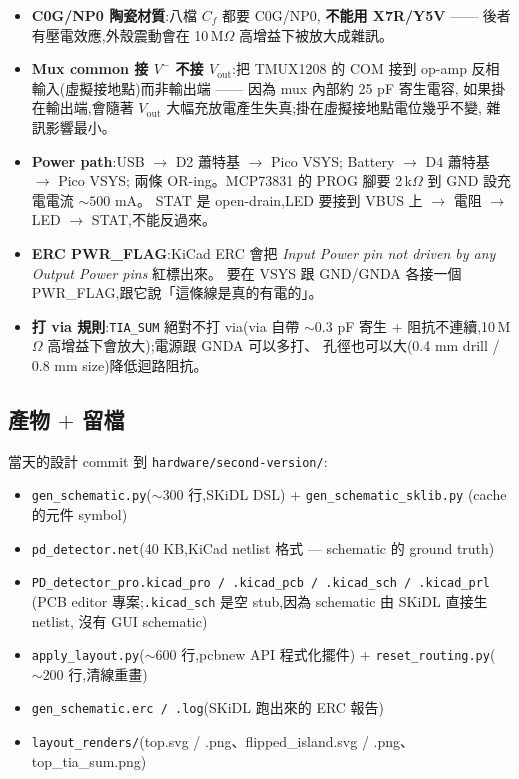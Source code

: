 \begin{itemize}[leftmargin=2em,itemsep=0pt]
  \item \textbf{C0G/NP0 陶瓷材質}:八檔 \(C_f\) 都要 C0G/NP0,
        \textbf{不能用 X7R/Y5V} —— 後者有壓電效應,外殼震動會在 10\,M\(\Omega\)
        高增益下被放大成雜訊。
  \item \textbf{Mux common 接 \(V^-\) 不接 \(V_\text{out}\)}:把 TMUX1208 的 COM 接到
        op-amp 反相輸入(虛擬接地點)而非輸出端 —— 因為 mux 內部約 25 pF 寄生電容,
        如果掛在輸出端,會隨著 \(V_\text{out}\) 大幅充放電產生失真;掛在虛擬接地點電位幾乎不變,
        雜訊影響最小。
  \item \textbf{Power path}:USB \(\to\) D2 蕭特基 \(\to\) Pico VSYS;
        Battery \(\to\) D4 蕭特基 \(\to\) Pico VSYS;
        兩條 OR-ing。MCP73831 的 PROG 腳要 2\,k\(\Omega\) 到 GND 設充電電流 \(\sim 500\) mA。
        STAT 是 open-drain,LED 要接到 VBUS 上 \(\to\) 電阻 \(\to\) LED \(\to\) STAT,不能反過來。
  \item \textbf{ERC PWR\_FLAG}:KiCad ERC 會把
        \emph{Input Power pin not driven by any Output Power pins} 紅標出來。
        要在 VSYS 跟 GND/GNDA 各接一個 PWR\_FLAG,跟它說「這條線是真的有電的」。
  \item \textbf{打 via 規則}:\texttt{TIA\_SUM} 絕對不打 via(via 自帶 \(\sim 0.3\) pF 寄生 +
        阻抗不連續,10\,M\(\Omega\) 高增益下會放大);電源跟 GNDA 可以多打、
        孔徑也可以大(0.4 mm drill / 0.8 mm size)降低迴路阻抗。
\end{itemize}

\subsection*{產物 \(+\) 留檔}

當天的設計 commit 到 \texttt{hardware/second-version/}:

\begin{itemize}[leftmargin=2em,itemsep=0pt]
  \item \texttt{gen\_schematic.py}(\(\sim 300\) 行,SKiDL DSL) + \texttt{gen\_schematic\_sklib.py}
        (cache 的元件 symbol)
  \item \texttt{pd\_detector.net}(40 KB,KiCad netlist 格式 — schematic 的 ground truth)
  \item \texttt{PD\_detector\_pro.kicad\_pro / .kicad\_pcb / .kicad\_sch / .kicad\_prl}
        (PCB editor 專案;\texttt{.kicad\_sch} 是空 stub,因為 schematic 由 SKiDL 直接生 netlist,
        沒有 GUI schematic)
  \item \texttt{apply\_layout.py}(\(\sim 600\) 行,pcbnew API 程式化擺件) +
        \texttt{reset\_routing.py}(\(\sim 200\) 行,清線重畫)
  \item \texttt{gen\_schematic.erc / .log}(SKiDL 跑出來的 ERC 報告)
  \item \texttt{layout\_renders/}(top.svg / .png、flipped\_island.svg / .png、top\_tia\_sum.png)
\end{itemize}

